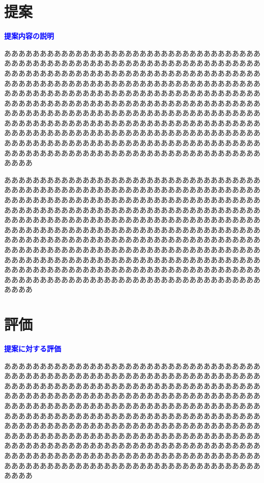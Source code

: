 \documentclass[dvipdfmx]{cs-handout}
\newcommand{\Note}[1]{\noindent \textbf{\textcolor{blue}{#1}}}
\begin{document}
\section{提案}
\Note{提案内容の説明}

ああああああああああああああああああああああああああああああああああああ
ああああああああああああああああああああああああああああああああああああ
ああああああああああああああああああああああああああああああああああああ
ああああああああああああああああああああああああああああああああああああ
ああああああああああああああああああああああああああああああああああああ
ああああああああああああああああああああああああああああああああああああ
ああああああああああああああああああああああああああああああああああああ
ああああああああああああああああああああああああああああああああああああ
ああああああああああああああああああああああああああああああああああああ
ああああああああああああああああああああああああああああああああああああ
ああああああああああああああああああああああああああああああああああああ
ああああ

ああああああああああああああああああああああああああああああああああああ
ああああああああああああああああああああああああああああああああああああ
ああああああああああああああああああああああああああああああああああああ
ああああああああああああああああああああああああああああああああああああ
ああああああああああああああああああああああああああああああああああああ
ああああああああああああああああああああああああああああああああああああ
ああああああああああああああああああああああああああああああああああああ
ああああああああああああああああああああああああああああああああああああ
ああああああああああああああああああああああああああああああああああああ
ああああああああああああああああああああああああああああああああああああ
ああああああああああああああああああああああああああああああああああああ
ああああ

\section{評価}
\Note{提案に対する評価}

ああああああああああああああああああああああああああああああああああああ
ああああああああああああああああああああああああああああああああああああ
ああああああああああああああああああああああああああああああああああああ
ああああああああああああああああああああああああああああああああああああ
ああああああああああああああああああああああああああああああああああああ
ああああああああああああああああああああああああああああああああああああ
ああああああああああああああああああああああああああああああああああああ
ああああああああああああああああああああああああああああああああああああ
ああああああああああああああああああああああああああああああああああああ
ああああああああああああああああああああああああああああああああああああ
ああああああああああああああああああああああああああああああああああああ
ああああ
\end{document}
